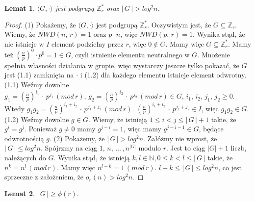 \documentclass[declaration,shortabstract]{iithesis}
\theoremstyle{definition}
\theoremstyle{remark} \newtheorem{observation}{Obserwacja}
\theoremstyle{plain} \newtheorem{theorem}{Twierdzenie}
\theoremstyle{plain} \newtheorem{lemma}{Lemat}
\theoremstyle{remark} \newtheorem*{remark*}{Uwaga}
\theoremstyle{reminder} \newtheorem*{reminder*}{Przypomnienie}
\begin{document}
\begin{lemma}\label{el_odwr}
	$\langle G, \cdot \rangle$ jest podgrupą $\mathbb{Z}_r^*$ oraz $|\,G\,| > log^2n$.
\end{lemma}
	
\begin{proof}
	(1) Pokażemy, że $\langle G, \cdot \rangle$ jest podgrupą $\mathbb{Z}_r^*$. Oczywistym jest, że $G \subseteq \mathbb{Z}_r$. Wiemy, że $NWD(n, \, r) = 1$ oraz $p \, | \, n$, więc $NWD(p, \, r) = 1$. Wynika stąd, że nie istnieje w $I$ element podzielny przez $r$, więc $0 \notin G$. Mamy więc $G \subseteq \mathbb{Z}_r^*$. Mamy też $(\frac{n}{p})^0\cdot p^0 = 1 \in G$, czyli istnienie elementu neutralnego w $G$. Mnożenie spełnia własności działania w grupie, więc wystarczy jeszcze tylko pokazać, że $G$ jest (1.1) zamknięta na $\cdot$ i (1.2) dla każdego elementu istnieje element odwrotny.\newline
	(1.1) Weźmy dowolne $g_1 = (\frac{n}{p})^{i_1} \, \cdot \, p^{j_1} \, (mod\,r), \, g_2 = (\frac{n}{p})^{i_2} \, \cdot \, p^{j_2}  \, (mod\,r) \in G, \, i_1, \,i_2, \,j_1, \, j_2 \geq 0$. Wtedy $g_1g_2 = (\frac{n}{p})^{i_1 + i_2} \, \cdot \, p^{j_1 + j_2} \, (mod\,r)$. $(\frac{n}{p})^{i_1 + i_2} \, \cdot \, p^{j_1 + j_2} \in I$, więc $g_1g_2\in G$. \newline
	(1.2) Weźmy dowolne $g \in G$. Wiemy, że istnieją $1 \leq i < j \leq | \, G \, | + 1$ takie, że $g^i = g^j$. Ponieważ $g \neq 0$ mamy $g^{j - i} = 1$, więc mamy $g^{j - i - 1} \in G$, będące odwrotnością $g$. \newline
	(2) Pokażemy, że $|\,G\,| > log^2n$. Załóżmy nie wprost, że $|\,G\,| \leq log^2n$. Spójrzmy na ciąg $1,\, n, \, \dots\,, n^{|G|}$ modulo $r$. Jest to ciąg $|G| + 1$ liczb, należących do $G$. Wynika stąd, że istnieją $k, l \in \mathbb{N}, 0 \leq k < l \leq |\,G\,|$ takie, że $n^k = n^l \, (mod\,r)$. Mamy więc $n^{l-k} = 1 \, (mod\,r)$. $l - k \leq |\,G\,| \leq log^2n$, co jest sprzeczne z założeniem, że $o_r(n) > log^2n$. 
\end{proof}
	
\begin{lemma} \label{phi_r}
	$| \, G \, | \geq \phi(r).$
\end{lemma}
	
\end{document}
